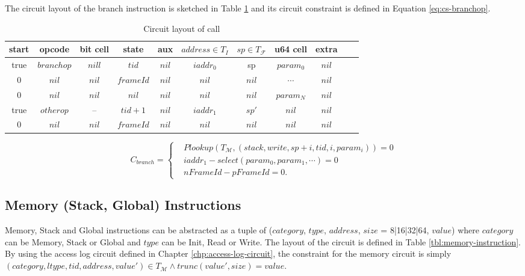 \smallskip The circuit layout of the branch instruction is sketched in Table \ref{tbl:branch-instruction} and its circuit constraint is defined in Equation \ref{eq:cs-branchop}. 
\begin{table}[!h]
\small
\begin{center}
\caption{Circuit layout of call}
\label{tbl:branch-instruction}
\begin{tabular}{ | c | c | c | c | c | c | c | c | c | c | c | }
  \hline
  start & opcode & bit cell & state & aux & $address \in T_{I}$ & $sp \in T_\mathcal{F}$& u64 cell & extra \\ 
  \hline
   true & $branchop$ & $nill$ & $tid$ & $nil$ & $iaddr_0$ & sp & $param_0$ & $nil$\\ 
 \hline
   0 & $nil$ & $nil$ & $frameId$ & $nil$ & $nil$ & $nil$ & $\cdots$ & $nil$\\ 
 \hline
   0 & $nil$ & $nil$ & $nil$ & $nil$ & $nil$ & $nil$ & $param_N$ & $nil$\\ 
 \hline
   true & $otherop$ & -- & $tid + 1$ & $nil$ & $iaddr_1$ & $sp'$ & $nil$ & $nil$\\
 \hline
   0 & $nil$ & $nil$ & $frameId$ & $nil$ & $nil$ & $nil$ & $nil$ & $nil$\\ 
 \hline
\end{tabular}

\end{center}
\end{table}
\begin{equation}
    C_{branch} = \begin{cases}
        &Plookup(T_\mathcal{M}, (stack, write, sp+i, tid, i, param_i)) = 0 \\
        &iaddr_1 - select(param_0, param_1, \cdots) = 0 \\
        &nFrameId - pFrameId = 0.
    \end{cases}
\label{eq:cs-branchop}
\end{equation}

\subsection{Memory (Stack, Global) Instructions}
Memory, Stack and Global instructions can be abstracted as a tuple of ($category$, $type$, $address$, $size$ = 8|16|32|64, $value$) where $category$ can be Memory, Stack or Global and $type$ can be Init, Read or Write. The layout of the circuit is defined in Table \ref{tbl:memory-instruction}. By using the access log circuit defined in Chapter \ref{chp:access-log-circuit}, the constraint for the memory circuit is simply $(category, ltype, tid, address, value') \in T_\mathcal{M} \wedge trunc(value', size) = value$.

